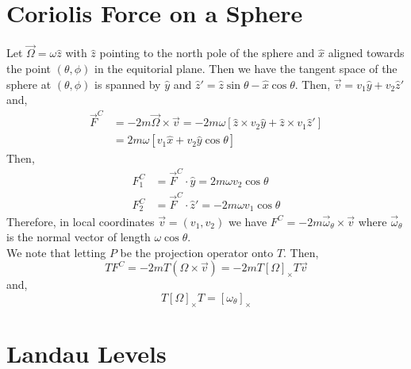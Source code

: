 \documentclass[12pt]{extarticle}
\theoremstyle{definition}
\begin{document}
\section{Coriolis Force on a Sphere}

Let $\vec{\Omega} = \omega \hat{z}$ with $\hat{z}$ pointing to the north pole of the sphere and $\hat{x}$ aligned towards the point $(\theta, \phi)$ in the equitorial plane. Then we have the tangent space of the sphere at $(\theta, \phi)$ is spanned by $\hat{y}$ and $\hat{z}' = \hat{z} \sin{\theta} - \hat{x} \cos{\theta}$. Then, $\vec{v} = v_1 \hat{y} + v_2 \hat{z}'$ and,
\begin{align*}
\vec{F}^C & = -2 m \vec{\Omega} \times \vec{v} = -2 m \omega [ \hat{z} \times v_2 \hat{y} + \hat{z} \times v_1 \hat{z}' ]
\\
& = 2 m \omega [v_1 \hat{x} + v_2 \hat{y} \cos{\theta}  ] 
\end{align*}
Then, 
\begin{align*}
F^C_1 & = \vec{F}^C \cdot \hat{y} = 2 m \omega v_2 \cos{\theta} 
\\
F^C_2 & = \vec{F}^C \cdot \hat{z}' = -2 m \omega v_1 \cos{\theta} 
\end{align*}
Therefore, in local coordinates $\vec{v} = (v_1, v_2)$ we have $F^C = - 2 m \vec{\omega}_\theta \times \vec{v}$ where $\vec{\omega}_\theta $ is the normal vector of length $\omega \cos{\theta}$.
\bigskip\\
We note that letting $P$ be the projection operator onto $T$. Then,
\[ T F^C = -2 m T(\Omega \times \vec{v}) = - 2 m T [\Omega]_\times T \vec{v} \]
and,
\[ T [\Omega]_\times T = [\omega_\theta]_\times \]

\section{Landau Levels}

\renewcommand{\a}{\hat{a}}
\newcommand{\adag}{\hat{a}^\dagger}
\newcommand{\bra}[1]{\left< #1 \right|}
\newcommand{\ket}[1]{\left| #1 \right>}
\end{document}
